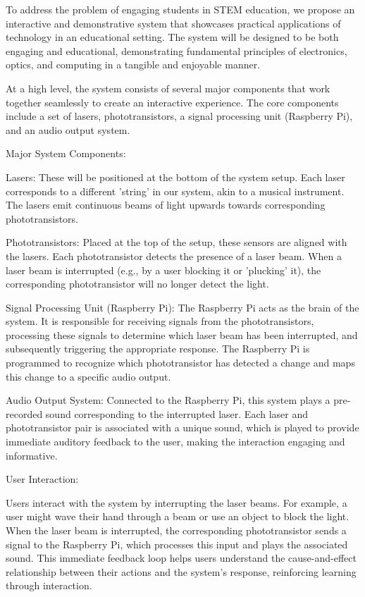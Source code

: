 To address the problem of engaging students in STEM education, we propose an interactive and demonstrative system that showcases practical applications of technology in an educational setting. The system will be designed to be both engaging and educational, demonstrating fundamental principles of electronics, optics, and computing in a tangible and enjoyable manner.

At a high level, the system consists of several major components that work together seamlessly to create an interactive experience. The core components include a set of lasers, phototransistors, a signal processing unit (Raspberry Pi), and an audio output system.

Major System Components:

Lasers:
These will be positioned at the bottom of the system setup. Each laser corresponds to a different 'string' in our system, akin to a musical instrument. The lasers emit continuous beams of light upwards towards corresponding phototransistors.

Phototransistors:
Placed at the top of the setup, these sensors are aligned with the lasers. Each phototransistor detects the presence of a laser beam. When a laser beam is interrupted (e.g., by a user blocking it or 'plucking' it), the corresponding phototransistor will no longer detect the light.

Signal Processing Unit (Raspberry Pi):
The Raspberry Pi acts as the brain of the system. It is responsible for receiving signals from the phototransistors, processing these signals to determine which laser beam has been interrupted, and subsequently triggering the appropriate response. The Raspberry Pi is programmed to recognize which phototransistor has detected a change and maps this change to a specific audio output.

Audio Output System:
Connected to the Raspberry Pi, this system plays a pre-recorded sound corresponding to the interrupted laser. Each laser and phototransistor pair is associated with a unique sound, which is played to provide immediate auditory feedback to the user, making the interaction engaging and informative.

User Interaction:

Users interact with the system by interrupting the laser beams. For example, a user might wave their hand through a beam or use an object to block the light. When the laser beam is interrupted, the corresponding phototransistor sends a signal to the Raspberry Pi, which processes this input and plays the associated sound. This immediate feedback loop helps users understand the cause-and-effect relationship between their actions and the system's response, reinforcing learning through interaction.

